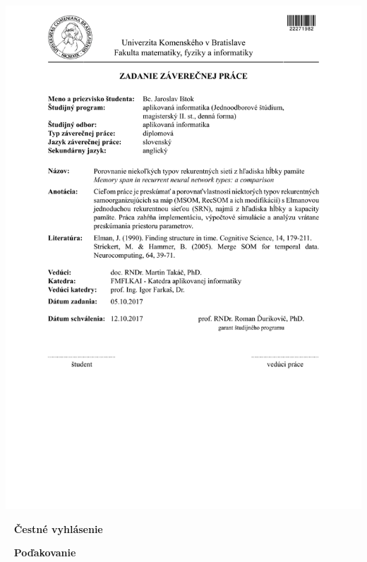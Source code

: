 \documentclass[12pt, oneside]{book}
\begin{document}
\newpage 
\thispagestyle{empty}
\hspace{-2cm}\includegraphics[width=1.1\textwidth]{assets/zadanie_master_thesis}



\frontmatter

\setcounter{page}{3}
\newpage 
~
\vfill
{\bf Čestné vyhlásenie }



\setcounter{page}{3}
\newpage 

~
\vfill
{\bf Poďakovanie }



\newpage 
\end{document}
